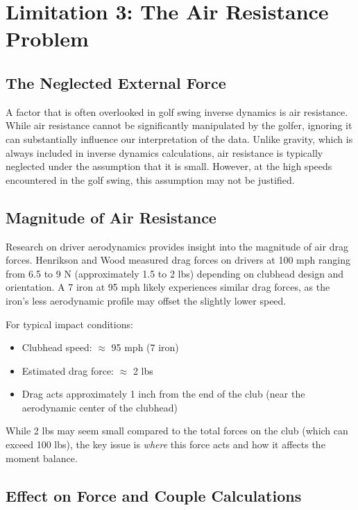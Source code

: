 \documentclass[11pt,a4paper]{article}
\theoremstyle{definition}
\theoremstyle{plain}
\begin{document}
\section{Limitation 3: The Air Resistance Problem}

\subsection{The Neglected External Force}

A factor that is often overlooked in golf swing inverse dynamics is air resistance. While air resistance cannot be significantly manipulated by the golfer, ignoring it can substantially influence our interpretation of the data. Unlike gravity, which is always included in inverse dynamics calculations, air resistance is typically neglected under the assumption that it is small. However, at the high speeds encountered in the golf swing, this assumption may not be justified.

\subsection{Magnitude of Air Resistance}

Research on driver aerodynamics provides insight into the magnitude of air drag forces. Henrikson and Wood measured drag forces on drivers at 100 mph ranging from 6.5 to 9 N (approximately 1.5 to 2 lbs) depending on clubhead design and orientation. A 7 iron at 95 mph likely experiences similar drag forces, as the iron's less aerodynamic profile may offset the slightly lower speed.

For typical impact conditions:
\begin{itemize}
    \item Clubhead speed: $\approx$ 95 mph (7 iron)
    \item Estimated drag force: $\approx$ 2 lbs
    \item Drag acts approximately 1 inch from the end of the club (near the aerodynamic center of the clubhead)
\end{itemize}

While 2 lbs may seem small compared to the total forces on the club (which can exceed 100 lbs), the key issue is \emph{where} this force acts and how it affects the moment balance.

\subsection{Effect on Force and Couple Calculations}
\end{document}
